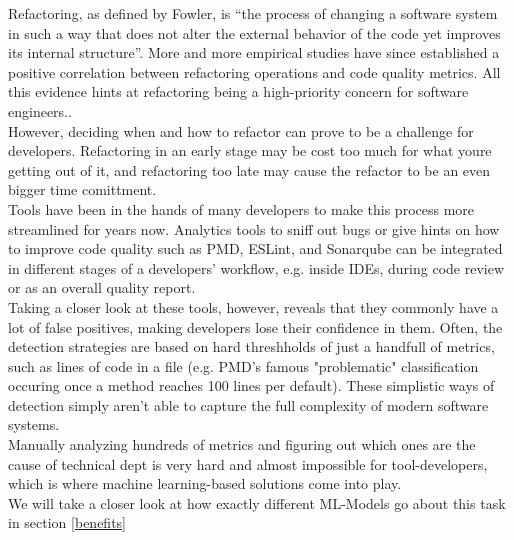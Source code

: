 Refactoring, as defined by Fowler\cite{fowler2018refactoring}, is “the process of changing a software system in such a way that does not alter the external behavior of the code yet improves its internal structure”. More and more empirical studies have since established a positive correlation between refactoring operations and code quality metrics. All this evidence hints at refactoring being a high-priority concern for software engineers.\cite{aniche2020effectiveness}.\\
However, deciding when and how to refactor can prove to be a challenge for developers. Refactoring in an early stage may be cost too much for what youre getting out of it, and refactoring too late may cause the refactor to be an even bigger time comittment.\cite{kruchten2012technical}\\
Tools have been in the hands of many developers to make this process more streamlined for years now. Analytics tools to sniff out bugs or give hints on how to improve code quality such as PMD, ESLint, and Sonarqube can be integrated in different stages of a developers' workflow, e.g. inside IDEs, during code review or as an overall quality report. \cite{aniche2020effectiveness}\\
Taking a closer look at these tools, however, reveals that they commonly have a lot of false positives, making developers lose their confidence in them. Often, the detection strategies are based on hard threshholds of just a handfull of metrics, such as lines of code in a file (e.g. PMD's famous "problematic" classification occuring once a method reaches 100 lines per default). These simplistic ways of detection simply aren't able to capture the full complexity of modern software systems.\\
Manually analyzing hundreds of metrics and figuring out which ones are the cause of technical dept is very hard and almost impossible for tool-developers, which is where machine learning-based solutions come into play.\\
We will take a closer look at how exactly different ML-Models go about this task in section \ref{benefits}
